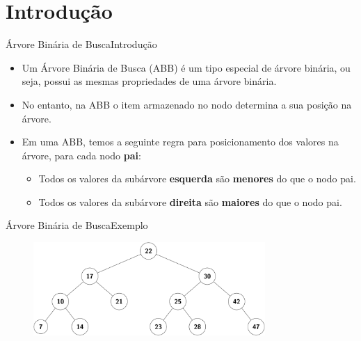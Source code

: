 \documentclass[aspectratio=169]{beamer}
\begin{document}
% 
%     
%     
%   
\section{Introdução} %


\begin{frame}{Árvore Binária de Busca}{Introdução}
\begin{itemize}
 \item Um Árvore Binária de Busca (ABB) é um tipo especial de árvore binária, ou seja, possui as mesmas propriedades de uma árvore binária.
 \item No entanto, na ABB o  item armazenado no nodo determina a sua posição na árvore.
 \item Em uma ABB, temos a seguinte regra para posicionamento dos valores na árvore, para cada nodo {\bf pai}:
 \begin{itemize}
 \item Todos os valores da subárvore {\bf esquerda} são {\bf menores} do que o nodo pai.
 \item Todos os valores da subárvore {\bf direita} são {\bf maiores} do que o nodo pai.
 \end{itemize} 
\end{itemize}
\end{frame}


\begin{frame}{Árvore Binária de Busca}{Exemplo}

\begin{figure}[!h]
  \centering
  \includegraphics[width=250pt]{imagens/abb.png}
  \label{fig_abb}
\end{figure}
\end{frame}
\end{document}
